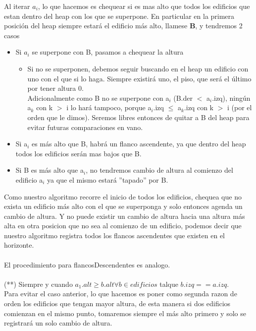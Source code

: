 Al iterar $a_i$, lo que hacemos es chequear si es mas alto que todos los edificios que estan dentro del heap con los que se superpone. En particular
en la primera posici\'on del heap siempre estar\'a el edificio m\'as alto, llamese \textbf{B}, y tendremos 2 casos
\begin{itemize}
\item Si $a_i$ se superpone con B, pasamos a chequear la altura
\begin{itemize}
\item Si no se superponen, debemos seguir buscando en el heap un edificio con uno con el que si lo haga. Siempre existir\'a uno, el piso, que ser\'a el \'ultimo por tener altura 0. 
\\
Adicionalmente como B no se superpone con a$_i$ (B.der $<$ a$_i$.izq), ning\'un a$_k$ con k $>$ i lo har\'a tampoco, porque a$_i$.izq $\leq$ a$_k$.izq con k $>$ i (por el orden que le dimos). Seremos libres entonces de quitar a B del heap para evitar futuras comparaciones en vano.
\end{itemize}
\item Si a$_i$ es m\'as alto que B, habr\'a un flanco ascendente, ya que dentro del heap todos los edificios ser\'an mas bajos que B.
\item Si B es m\'as alto que a$_i$, no tendremos cambio de altura al comienzo del edificio a$_i$ ya que el mismo estar\'a ''tapado'' por B.
\end{itemize}

Como nuestro algoritmo recorre el inicio de todos los edificios, chequea que no exista un edificio m\'as alto con el que se superponga y solo entonces agenda un cambio de altura.
Y no puede existir un cambio de altura hacia una altura m\'as alta en otra posicion que no sea al comienzo de un edificio, podemos decir que nuestro algoritmo registra todos los flancos ascendentes que existen en el horizonte.
\\
\\
El procedimiento para flancosDescendentes es analogo.
\\
\\
(**) Siempre y cuando $a_1.alt \ge b.alt \forall b \in edificios$ talque $b.izq == a.izq$.\\
Para evitar el caso anterior, lo que hacemos es poner como segunda razon de orden los edificios que tengan mayor altura, de esta manera si dos edificios comienzan en el mismo punto, tomaremos siempre el m\'as alto primero y solo se registrar\'a un solo cambio de altura. 




